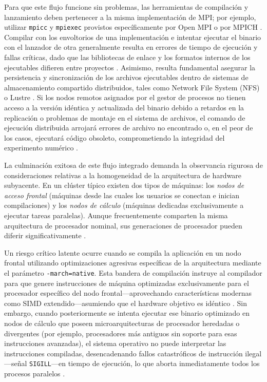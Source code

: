 Para que este flujo funcione sin problemas, las herramientas de compilación y lanzamiento deben pertenecer a la misma implementación de MPI; por ejemplo, utilizar \texttt{mpicc} y \texttt{mpiexec} provistos específicamente por Open MPI o por MPICH \cite{open_mpi_2026}. Compilar con los envoltorios de una implementación e intentar ejecutar el binario con el lanzador de otra generalmente resulta en errores de tiempo de ejecución y fallas críticas, dado que las bibliotecas de enlace y los formatos internos de los ejecutables difieren entre proyectos \cite{open_mpi_2026}. Asimismo, resulta fundamental asegurar la persistencia y sincronización de los archivos ejecutables dentro de sistemas de almacenamiento compartido distribuidos, tales como Network File System (NFS) o Lustre \cite{grama_intro_parallel_2003}. Si los nodos remotos asignados por el gestor de procesos no tienen acceso a la versión idéntica y actualizada del binario debido a retardos en la replicación o problemas de montaje en el sistema de archivos, el comando de ejecución distribuida arrojará errores de archivo no encontrado o, en el peor de los casos, ejecutará código obsoleto, comprometiendo la integridad del experimento numérico \cite{pacheco_2011}.

La culminación exitosa de este flujo integrado demanda la observancia rigurosa de consideraciones relativas a la homogeneidad de la arquitectura de hardware subyacente. En un clúster típico existen dos tipos de máquinas: los \textit{nodos de acceso frontal} (máquinas desde las cuales los usuarios se conectan e inician compilaciones) y los \textit{nodos de cálculo} (máquinas dedicadas exclusivamente a ejecutar tareas paralelas). Aunque frecuentemente comparten la misma arquitectura de procesador nominal, sus generaciones de procesador pueden diferir significativamente \cite{gropp_using_mpi_1999}.

Un riesgo crítico latente ocurre cuando se compila la aplicación en un nodo frontal utilizando optimizaciones agresivas específicas de la arquitectura mediante el parámetro \texttt{-march=native}. Esta bandera de compilación instruye al compilador para que genere instrucciones de máquina optimizadas exclusivamente para el procesador específico del nodo frontal—aprovechando características modernas como SIMD extendido—asumiendo que el hardware objetivo es idéntico \cite{gropp_using_mpi_1999}. Sin embargo, cuando posteriormente se intenta ejecutar ese binario optimizado en nodos de cálculo que poseen microarquitecturas de procesador heredadas o divergentes (por ejemplo, procesadores más antiguos sin soporte para esas instrucciones avanzadas), el sistema operativo no puede interpretar las instrucciones compiladas, desencadenando fallos catastróficos de instrucción ilegal—señal \texttt{SIGILL}—en tiempo de ejecución, lo que aborta inmediatamente todos los procesos paralelos \cite{gropp_using_mpi_1999}.

